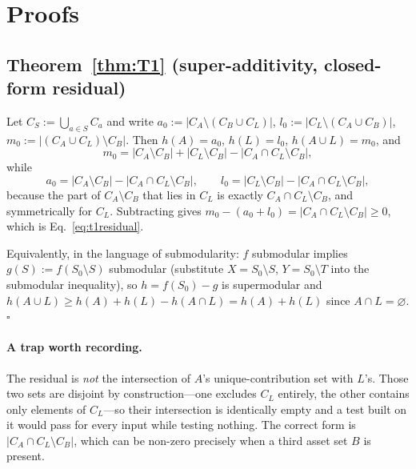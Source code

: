 \documentclass{article}
\begin{document}
\clearpage
\label{page:endmain}%



\appendix

\section{Proofs}
\label{app:proofs}

\subsection*{Theorem~\ref{thm:T1} (super-additivity, closed-form residual)}

Let $C_S:=\bigcup_{a\in S}C_a$ and write
$a_0:=|C_A\setminus(C_B\cup C_L)|$, $l_0:=|C_L\setminus(C_A\cup C_B)|$,
$m_0:=|(C_A\cup C_L)\setminus C_B|$. Then $h(A)=a_0$, $h(L)=l_0$, $h(A\cup L)=m_0$, and
\begin{equation}
m_0=|C_A\setminus C_B|+|C_L\setminus C_B|-|C_A\cap C_L\setminus C_B|,
\end{equation}
while
\begin{equation}
a_0=|C_A\setminus C_B|-|C_A\cap C_L\setminus C_B|,\qquad
l_0=|C_L\setminus C_B|-|C_A\cap C_L\setminus C_B|,
\end{equation}
because the part of $C_A\setminus C_B$ that lies in $C_L$ is exactly $C_A\cap C_L\setminus C_B$, and
symmetrically for $C_L$. Subtracting gives
$m_0-(a_0+l_0)=|C_A\cap C_L\setminus C_B|\ge0$, which is Eq.~\eqref{eq:t1residual}.

Equivalently, in the language of submodularity: $f$ submodular implies $g(S):=f(S_0\setminus S)$ submodular
(substitute $X=S_0\setminus S$, $Y=S_0\setminus T$ into the submodular inequality), so $h=f(S_0)-g$ is
supermodular and $h(A\cup L)\ge h(A)+h(L)-h(A\cap L)=h(A)+h(L)$ since $A\cap L=\varnothing$. $\square$

\paragraph{A trap worth recording.} The residual is \emph{not} the intersection of $A$'s unique-contribution
set with $L$'s. Those two sets are disjoint by construction---one excludes $C_L$ entirely, the other
contains only elements of $C_L$---so their intersection is identically empty and a test built on it would
pass for every input while testing nothing. The correct form is $|C_A\cap C_L\setminus C_B|$, which can be
non-zero precisely when a third asset set $B$ is present.
\end{document}
